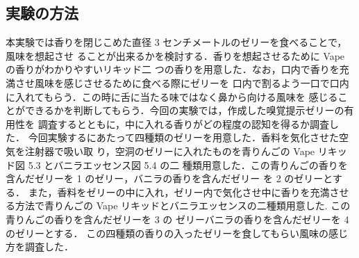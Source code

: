 \subsection{実験の方法}
本実験では香りを閉じこめた直径 3 センチメートルのゼリーを食べることで，風味を想起させ
ることが出来るかを検討する．香りを想起させるために Vape の香りがわかりやすいリキッド二
つの香りを用意した．なお，口内で香りを充満させ風味を感じさせるために食べる際にゼリーを
口内で割るよう一口で口内に入れてもらう．この時に舌に当たる味ではなく鼻から向ける風味を
感じることができるかを判断してもらう．今回の実験では，作成した嗅覚提示ゼリーの有用性を
調査するとともに，中に入れる香りがどの程度の認知を得るか調査した．
今回実験するにあたって四種類のゼリーを用意した．香料を気化させた空気を注射器で吸い取
り，空洞のゼリーに入れたものを青りんごの Vape リキッド図 5.3 とバニラエッセンス図 5.4 の二
種類用意した．この青りんごの香りを含んだゼリーを 1 のゼリー，バニラの香りを含んだゼリー
を 2 のゼリーとする．
また，香料をゼリーの中に入れ，ゼリー内で気化させ中に香りを充満させる方法で青りんごの
Vape リキッドとバニラエッセンスの二種類用意した. この青りんごの香りを含んだゼリーを 3 の
ゼリーバニラの香りを含んだゼリーを 4 のゼリーとする．
この四種類の香りの入ったゼリーを食してもらい風味の感じ方を調査した．